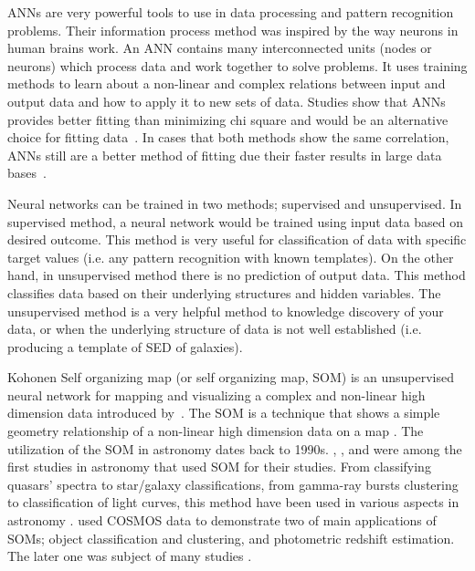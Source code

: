 ANNs are very powerful tools to use in data processing and pattern recognition problems.
Their information process method was inspired by the way neurons in human brains work.
An ANN contains many interconnected units (nodes or neurons) which process data and work together to solve problems.
It uses training methods to learn about a non-linear and complex relations between input and output data and how to apply it to new sets of data.
Studies show that ANNs provides better fitting than minimizing chi square and would be an alternative choice for fitting data~\citep[e.g.][]{Marquez91,Moayed09}.
In cases that both methods show the same correlation, ANNs still are a better method of fitting due their faster results in large data bases~\citep[][]{Gulati97}.

Neural networks can be trained in two methods; supervised and unsupervised.
In supervised method, a neural network would be trained using input data based on desired outcome.
This method is very useful for classification of data with specific target values (i.e. any pattern recognition with known templates).
On the other hand, in unsupervised method there is no prediction of output data.
This method classifies data based on their underlying structures and hidden variables.
The unsupervised method is a very helpful method to knowledge discovery of your data, or when the underlying structure of data is not well established (i.e. producing a template of SED of galaxies).

Kohonen Self organizing map (or self organizing map, SOM) is an unsupervised neural network for mapping and visualizing a complex and non-linear high dimension data introduced by~\citep{Kohonen82}.
The SOM is a technique that shows a simple geometry relationship of a non-linear high dimension data on a map \citep{Kohonen98}.
The utilization of the SOM in astronomy dates back to 1990s. 
\citet[][]{Odewahn92}, \citet[][]{Hernandez94}, and \citet[][]{Murtagh95} were among the first studies in astronomy that used SOM for their studies.
From classifying quasars' spectra to star/galaxy classifications, from gamma-ray bursts clustering to classification of light curves, this method have been used in various aspects in astronomy \citep[e.g.][]{Maehoenen95, Miller96,Andreon00,Balastegui01,Rajaniemi02,Brett04,Scaringi09}.
\citet{Geach12} used COSMOS data to demonstrate two of main applications of SOMs; object classification and clustering, and photometric redshift estimation. 
The later one was subject of many studies \citep[e.g.][]{Kind14a}.


